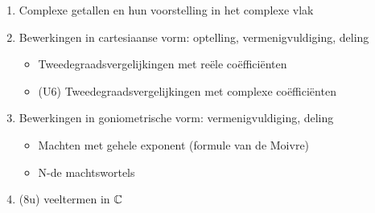 \documentclass{ximera}
\begin{document}

    \begin{enumerate}
    \item Complexe getallen en hun voorstelling in het complexe vlak
    \item Bewerkingen in cartesiaanse vorm: optelling, vermenigvuldiging, deling
        \begin{itemize}
            \item Tweedegraadsvergelijkingen met reële coëfficiënten
            \item (U6) Tweedegraadsvergelijkingen met complexe coëfficiënten
        \end{itemize}
    \item Bewerkingen in goniometrische vorm: vermenigvuldiging, deling
        \begin{itemize}
            \item Machten met gehele exponent (formule van de Moivre)
            \item N-de machtswortels
        \end{itemize}
    \item (8u) veeltermen in $\mathbb{C}$

    \end{enumerate}
    
    
\end{document}
